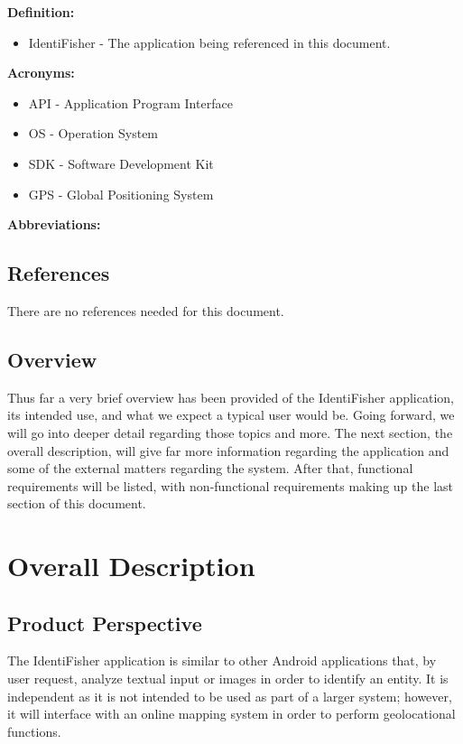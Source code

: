 \documentclass{article}
\begin{document}
\textbf{Definition:}

\begin{itemize}
	\item IdentiFisher - The application being referenced in this document.
\end{itemize}
\textbf{Acronyms:}

\begin{itemize}
	\item API - Application Program Interface
	\item OS - Operation System
	\item SDK - Software Development Kit
	\item GPS - Global Positioning System
\end{itemize}
\textbf{Abbreviations:}

\subsection{References}
There are no references needed for this document.

\subsection{Overview}
Thus far a very brief overview has been provided of the IdentiFisher application, its intended
use, and what we expect a typical user would be. Going forward, we will go into deeper detail
regarding those topics and more. The next section, the overall description, will give far more information regarding
the application and some of the external matters regarding the system. After that, functional
requirements will be listed, with non-functional requirements making up the last section of this document.

\section{Overall Description}

\subsection{Product Perspective}

The IdentiFisher application is similar to other Android applications that,
by user request, analyze textual input or images in order to identify
an entity. It is independent as it is not intended to be used as part
of a larger system; however, it will interface with an online mapping
system in order to perform geolocational functions.
\end{document}
